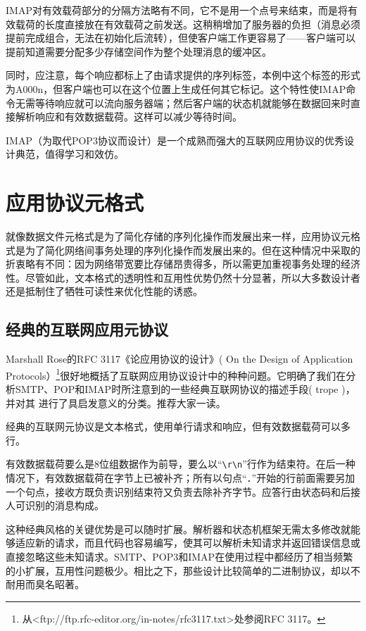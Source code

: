 \documentclass[12pt,oneside]{book}
\begin{document}
\begin{common-format}
IMAP对有效载荷部分的分隔方法略有不同，它不是用一个点号来结束，而是将有效载荷的长度直接放在有效载荷之前发送。这稍稍增加了服务器的负担（消息必须提前完成组合，无法在初始化后流转），但使客户端工作更容易了——客户端可以提前知道需要分配多少存储空间作为整个处理消息的缓冲区。

同时，应注意，每个响应都标上了由请求提供的序列标签，本例中这个标签的形式为A000n，但客户端也可以在这个位置上生成任何其它标记。这个特性使IMAP命令无需等待响应就可以流向服务器端；然后客户端的状态机就能够在数据回来时直接解析响应和有效数据载荷。这样可以减少等待时间。

IMAP（为取代POP3协议而设计）是一个成熟而强大的互联网应用协议的优秀设计典范，值得学习和效仿。


\section{应用协议元格式}
就像数据文件元格式是为了简化存储的序列化操作而发展出来一样，应用协议元格式是为了简化网络间事务处理的序列化操作而发展出来的。但在这种情况中采取的折衷略有不同：因为网络带宽要比存储昂贵得多，所以需更加重视事务处理的经济性。尽管如此，文本格式的透明性和互用性优势仍然十分显著，所以大多数设计者还是抵制住了牺牲可读性来优化性能的诱惑。

\subsection{经典的互联网应用元协议}
Marshall Rose的RFC 3117《论应用协议的设计》( On the Design of Application Protocols）\footnote{从<ftp://ftp.rfc-editor.org/in-notes/rfc3117.txt>处参阅RFC 3117。}很好地概括了互联网应用协议设计中的种种问题。它明确了我们在分析SMTP、POP和IMAP时所注意到的一些经典互联网协议的描述手段( trope )，并对其
进行了具启发意义的分类。推荐大家一读。

经典的互联网元协议是文本格式，使用单行请求和响应，但有效数据载荷可以多行。

有效数据载荷要么是8位组数据作为前导，要么以“\verb+\r\n+”行作为结束符。在后一种情况下，有效数据载荷在字节上已被补齐；所有以句点“．”开始的行前面需要另加一个句点，接收方既负责识别结束符又负责去除补齐字节。应答行由状态码和后接人可识别的消息构成。

这种经典风格的关键优势是可以随时扩展。解析器和状态机框架无需太多修改就能够适应新的请求，而且代码也容易编写，使其可以解析未知请求并返回错误信息或直接忽略这些未知请求。SMTP、POP3和IMAP在使用过程中都经历了相当频繁的小扩展，互用性问题极少。相比之下，那些设计比较简单的二进制协议，却以不耐用而臭名昭著。


\end{common-format}
\end{document}
